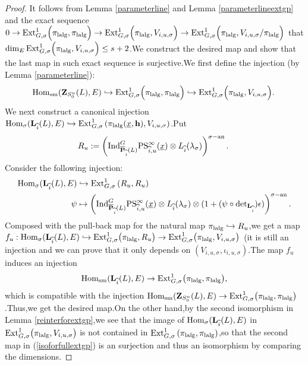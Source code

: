 \documentclass[10pt]{article}
\newcommand{\ind}{{\rm Ind}}
\newcommand{\homo}{{\rm Hom}}
\newcommand{\ext}{{\rm Ext}}
\newcommand{\ana}{{\rm an}}
\newcommand{\op}{{\overline{{\mathbf{P}}}}}
\newcommand{\sm}{{\rm sm}}
\newcommand{\lalg}{{\rm lalg}}
\newcommand{\bL}{{\mathbf{L}}}
\newcommand{\bZ}{{\mathbf{Z}}}
\newcommand{\bh}{{\mathbf{h}}}
\begin{document}
\begin{proof}It follows from Lemma \ref{parameterline} and Lemma \ref{parameterlineextgp} and 
	the  exact sequence $0\rightarrow \ext^1_{G,\sigma}\Big(\pi_{\lalg},\pi_{\lalg}\Big) \rightarrow \ext^1_{G,\sigma}\Big(\pi_{\lalg},V_{i,u,\sigma}\Big) \rightarrow \ext^1_{G,\sigma}\Big(\pi_{\lalg},V_{i,u,\sigma}/\pi_{\lalg}\Big)$ that $\dim_E\ext^1_{G,\sigma}\Big(\pi_{\lalg},V_{i,u,\sigma}\Big)\leq s+2$.\;We construct the desired map and show that the last map in such exact sequence is surjective.\;We first define the injection (by Lemma \ref{parameterline}):
\begin{equation}
		\homo_{\sm}(\bZ_{S^u_0}(L),E)\hookrightarrow \ext^1_{G,\sigma}\Big(\pi_{\lalg},\pi_{\lalg}\Big)\hookrightarrow \ext^1_{G,\sigma}\Big(\pi_{\lalg},V_{i,u,\sigma}\Big).\;
\end{equation}
We next construct a canonical injection $\homo_{\sigma}(\bL_{\widehat{i}}(L),E)\hookrightarrow\ext^1_{G,\sigma}\left(\pi_{\lalg}(\underline{x},\bh),V_{i,u,\sigma}\right)$.\;Put
	\begin{equation}
		R_{u}:=\left(\ind^G_{\op_{\widehat{i}}(L)}\mathrm{PS}^{\infty}_{\widehat{i},u}(\underline{x})\otimes L_{\widehat{i}}(\lambda_{\sigma})\right)^{\sigma-\ana}.\;
	\end{equation}
Consider the following injection:
	\begin{equation}
		\begin{aligned}
			\homo_{\sigma}(\bL_{\widehat{i}}(L),E)&\hookrightarrow \ext^1_{G,\sigma}\left(R_{u},R_{u}\right)\\
			\psi&\mapsto \left(\ind^G_{\op_{\widehat{i}}(L)}\mathrm{PS}^{\infty}_{\widehat{i},u}(\underline{x})\otimes L_{\widehat{i}}(\lambda_{\sigma})\otimes(1+(\psi\circ\det\nolimits_{\bL_{\widehat{i}}})\epsilon)\right)^{\sigma-\ana}.
		\end{aligned}
	\end{equation}
	Composed with the pull-back map for the natural map $\pi_{\lalg}\hookrightarrow R_{u}$,\;we get a map $f_u:\homo_{\sigma}(\bL_{\widehat{i}}(L),E)\hookrightarrow \ext^1_{G,\sigma}\big(\pi_{\lalg},R_{u}\big)\rightarrow  \ext^1_{G,\sigma}\big(\pi_{\lalg},V_{i,u,\sigma}\big)
	$ (it is still an injection and we can prove that it only depends on $(V_{i,u,\sigma},\iota_{i,u,\sigma})$.\;The map $f_u$ induces an injection
	\[\homo_{\sm}(\bL_{\widehat{i}}(L),E)\rightarrow \ext^{1}_{G,\sigma}\big(\pi_{\lalg},\pi_{\lalg}\big),\]
	which is compatible with the injection $\homo_{\sm}(\bZ_{S^u_0}(L),E)\rightarrow\ext^1_{G,\sigma}\big(\pi_{\lalg},\pi_{\lalg}\big)$.\;Thus,\;we get the desired map.\;On the other hand,\;by the second isomorphism in Lemma \ref{reinterforextgp},\;we see that the image of $\homo_{\sigma}(\bL_{\widehat{i}}(L),E)$ in $\ext^1_{G,\sigma}\big(\pi_{\lalg},V_{i,u,\sigma}\big)$ is not contained in $\ext^1_{G,\sigma}\left(\pi_{\lalg},\pi_{\lalg}\right)$,\;so that the second map in (\ref{isoforfullextgp}) is an surjection and thus an isomorphism by comparing the dimensions.\;
\end{proof}
\end{document}

